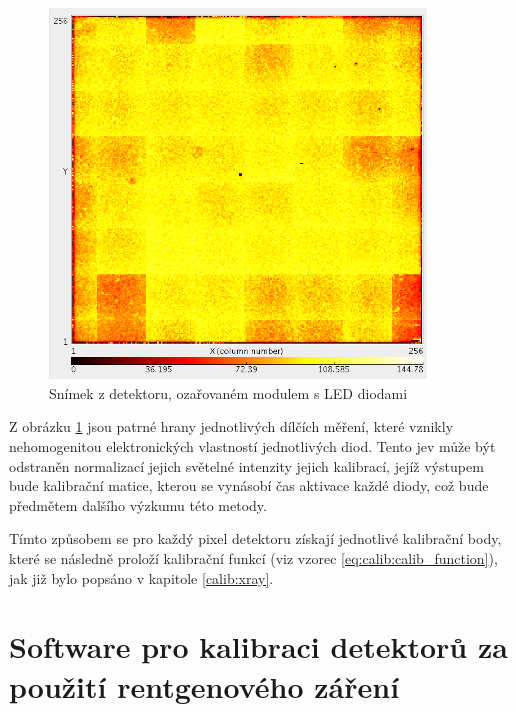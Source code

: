 \begin{figure}[th]
	\begin{center}
		\includegraphics[width=10cm]{figures/led_calib_frame.png}
		\caption{Snímek z detektoru, ozařovaném modulem s LED diodami}
		\label{fig:calib:led_frame}
	\end{center}
\end{figure}

Z obrázku \ref{fig:calib:led_frame} jsou patrné hrany jednotlivých dílčích měření, které vznikly nehomogenitou elektronických vlastností jednotlivých diod. Tento jev může být odstraněn normalizací jejich světelné intenzity jejich kalibrací, jejíž výstupem bude kalibrační matice, kterou se vynásobí čas aktivace každé diody, což bude předmětem dalšího výzkumu této metody.

Tímto způsobem se pro každý pixel detektoru získají jednotlivé kalibrační body, které se následně proloží kalibrační funkcí (viz vzorec \ref{eq:calib:calib_function}), jak již bylo popsáno v kapitole \ref{calib:xray}.


\section{Software pro kalibraci detektorů za použití rentgenového záření}
































